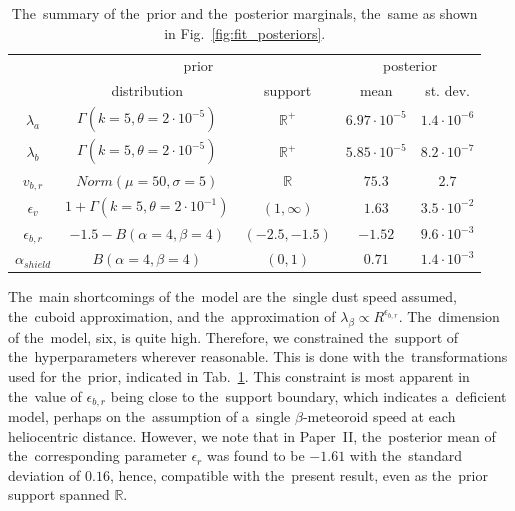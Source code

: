 \begin{table}[t]
\caption{The~summary of the~prior and the~posterior marginals, the~same as shown in Fig.~\ref{fig:fit_posteriors}.}
\centering
\label{tab:prior_posterior}
\begin{tabular}{c|cc|cc}
\multicolumn{1}{c}{  } \vline & \multicolumn{2}{c}{prior} \vline & \multicolumn{2}{c}{posterior} \\ 
& distribution & support & mean & st. dev. \\
\hline
$\lambda_a$ & $\Gamma(k=5,\theta=2\cdot10^{-5})$ & $\mathbb{R}^+$ &
$6.97 \cdot 10^{-5}$ & $1.4 \cdot 10^{-6}$  \\
$\lambda_b$ & $\Gamma(k=5,\theta=2\cdot10^{-5})$ & $\mathbb{R}^+$ & 
$5.85 \cdot 10^{-5}$ & $8.2 \cdot 10^{-7}$  \\
$v_{b,r}$ & $Norm(\mu=50,\sigma=5)$ & $\mathbb{R}$ & 
$75.3$ & $2.7$  \\
$\epsilon_v$ & $1+\Gamma(k=5,\theta=2\cdot10^{-1})$ & $(1,\infty)$ &
$1.63$ & $3.5 \cdot 10^{-2}$  \\
$\epsilon_{b,r}$ & $-1.5-B(\alpha=4,\beta=4)$ & $(-2.5,-1.5)$ &
$-1.52$ & $9.6 \cdot 10^{-3}$  \\
$\alpha_{shield}$ & $B(\alpha=4,\beta=4)$ & $(0,1)$ & 
$0.71$ & $1.4 \cdot 10^{-3}$  \\
\hline
\end{tabular}
\end{table}

The~main shortcomings of the~model are the~single dust speed assumed, the~cuboid approximation, and the~approximation of $\lambda_\beta \propto R^{\epsilon_{b,r}}$. The~dimension of the~model, six, is quite high. Therefore, we constrained the~support of the~hyperparameters wherever reasonable. This is done with the~transformations used for the~prior, indicated in Tab.~\ref{tab:prior_posterior}. This constraint is most apparent in the~value of $\epsilon_{b,r}$ being close to the~support boundary, which indicates a~deficient model, perhaps on the~assumption of a~single $\beta$-meteoroid speed at each heliocentric distance. However, we note that in Paper~II, the~posterior mean of the~corresponding parameter $\epsilon_r$ was found to be $-1.61$ with the~standard deviation of $0.16$, hence, compatible with the~present result, even as the~prior support spanned $\mathbb{R}$.

